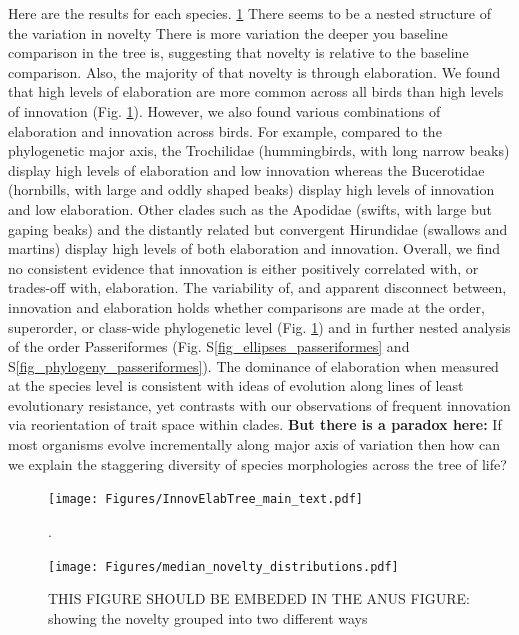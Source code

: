 \documentclass[12pt,letterpaper]{article}
\begin{document}
Here are the results for each species. \ref{Fig:phylogeny}
There seems to be a nested structure of the variation in novelty %
There is more variation the deeper you baseline comparison in the tree is, suggesting that novelty is relative to the baseline comparison.
Also, the majority of that novelty is through elaboration.
We found that high levels of elaboration are more common across all birds than high levels of innovation (Fig. \ref{Fig:phylogeny}).
However, we also found various combinations of elaboration and innovation across birds.
For example, compared to the phylogenetic major axis, the Trochilidae (hummingbirds, with long narrow beaks) display high levels of elaboration and low innovation whereas the Bucerotidae (hornbills, with large and oddly shaped beaks) display high levels of innovation and low elaboration.
Other clades such as the Apodidae (swifts, with large but gaping beaks) and the distantly related but convergent Hirundidae (swallows and martins) display high levels of both elaboration and innovation.
Overall, we find no consistent evidence that innovation is either positively correlated with, or trades-off with, elaboration. %
The variability of, and apparent disconnect between, innovation and elaboration holds whether comparisons are made at the order, superorder, or class-wide phylogenetic level (Fig. \ref{Fig:phylogeny})%
 and in further nested analysis of the order Passeriformes (Fig. S\ref{fig_ellipses_passeriformes} and S\ref{fig_phylogeny_passeriformes}).
The dominance of elaboration when measured at the species level is consistent with ideas of evolution along lines of least evolutionary resistance, yet contrasts with our observations of frequent innovation via reorientation of trait space within clades.
\textbf{But there is a paradox here:}
If most organisms evolve incrementally along major axis of variation then how can we explain the staggering diversity of species morphologies across the tree of life?

\begin{figure}[!htbp]
\centering
    \texttt{[image: Figures/InnovElabTree\_main\_text.pdf]}
\caption{.}
\label{Fig:phylogeny}
\end{figure}

\begin{figure}[!htbp]
\centering
    \texttt{[image: Figures/median\_novelty\_distributions.pdf]}
\caption{THIS FIGURE SHOULD BE EMBEDED IN THE ANUS FIGURE: showing the novelty grouped into two different ways}
\label{Fig:phylogeny_2}
\end{figure}
\end{document}
